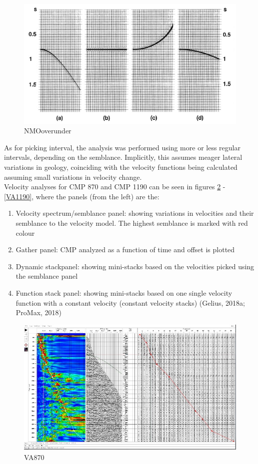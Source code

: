 \documentclass[10pt,a4paper]{article}
\begin{document}
\begin{figure}[H]
\includegraphics[width=\textwidth]{NMOcorr_over_under.jpg}
\caption{NMOoverunder}
\label{NMOoverunder}
\end{figure}

\noindent As for picking interval, the analysis was performed using more or less regular intervals, depending on the semblance. Implicitly, this assumes meager lateral variations in geology, coinciding with the velocity functions being calculated assuming small variations in velocity change. 
\\
Velocity analyses for CMP 870 and CMP 1190 can be seen in figures \ref{VA870} - \ref{VA1190}, where the panels (from the left) are the:

\begin{enumerate}
    \item Velocity spectrum/semblance panel: showing variations in velocities and their semblance to the velocity model. The highest semblance is marked with red colour
    \item Gather panel: CMP analyzed as a function of time and offset is plotted
    \item Dynamic stackpanel: showing mini-stacks based on the velocities picked using the semblance panel
    \item Function stack panel: showing mini-stacks based on one single velocity function with a constant velocity (constant velocity stacks) (Gelius, 2018a; ProMax, 2018)
\end{enumerate}

\begin{figure}[H]
\includegraphics[width=\textwidth]{Velo_anal_870.jpg}
\caption{VA870}
\label{VA870}
\end{figure}
\end{document}
